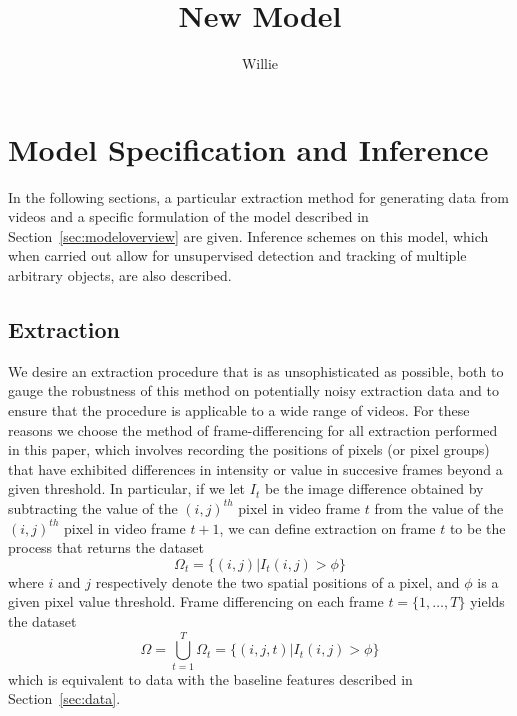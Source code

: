 \documentclass{article}
\begin{document}
\title{New Model}
\author{Willie}
\maketitle


\section{Model Specification and Inference}

In the following sections, a particular extraction method for generating data from videos and a specific formulation of the model described in Section~\ref{sec:modeloverview} are given. Inference schemes on this model, which when carried out allow for unsupervised detection and tracking of multiple arbitrary objects, are also described.



\subsection{Extraction}
\label{sec:modelspec_extraction}

We desire an extraction procedure that is as unsophisticated as possible, both to gauge the robustness of this method on potentially noisy extraction data and to ensure that the procedure is applicable to a wide range of videos. For these reasons we choose the method of frame-differencing for all extraction performed in this paper, which involves recording the positions of pixels (or pixel groups) that have exhibited differences in intensity or value in succesive frames beyond a given threshold. In particular, if we let $I_{t}$ be the image difference obtained by subtracting the value of the $(i,j)^{th}$ pixel in video frame $t$ from the value of the $(i,j)^{th}$ pixel in video frame $t+1$, we can define extraction on frame $t$ to be the process that returns the dataset
\begin{equation}
	\Omega_{t} = \{ (i,j) | I_{t}(i,j) > \phi \}
\end{equation}
where $i$ and $j$ respectively denote the two spatial positions of a pixel, and $\phi$ is a given pixel value threshold. Frame differencing on each frame $t =\{1, \ldots, T \}$ yields the dataset
\begin{equation}
	\Omega = \bigcup_{t=1}^{T} \Omega_{t} = \{ (i,j,t) | I_{t}(i,j) > \phi \}
\end{equation}
which is equivalent to data with the baseline features described in Section~\ref{sec:data}.
\end{document}
